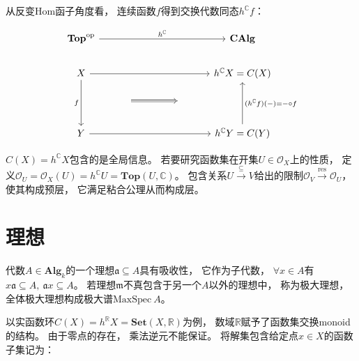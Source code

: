 \documentclass[10pt, openany]{book}
\begin{document}
从反变Hom函子角度看，
连续函数$f$得到交换代数同态$h^\mathbb C f$：

$$
\begin{tikzcd}
\textbf{Top}^\text{op} \arrow[rrrr, "h^\mathbb C"] &                           &  &    & \textbf{CAlg}                                                      \\
X \arrow[dd, "f"'] \arrow[rrrr]                    &                           &  &    & h^\mathbb C X = C(X)                                               \\
                                                   & {} \arrow[rr, Rightarrow] &  & {} &                                                                    \\
Y \arrow[rrrr]                                     &                           &  &    & h^\mathbb C Y = C(Y) \arrow[uu, "(h^\mathbb C f)(-) = - \circ f"']
\end{tikzcd}
$$

$C(X) = h^\mathbb C X$包含的是全局信息。
若要研究函数集在开集$U \in \mathcal O_X$上的性质，
定义$\mathcal O_U = \mathcal O_X(U) = h^\mathbb C U = \textbf{Top}(U,\mathbb C)$。
包含关系$U \stackrel{\subseteq}{\longrightarrow} V$给出的限制$\mathcal O_V \stackrel{\text{res}}{\longrightarrow} \mathcal O_U$，
使其构成预层，
它满足粘合公理从而构成层。

\section{理想}

代数$A\in\textbf{Alg}_k$的一个理想$\mathfrak a \subseteq A$具有吸收性，
它作为子代数，
$\forall x \in A$有$x \mathfrak a \subseteq A,\ \mathfrak a x \subseteq A$。
若理想$\mathfrak m$不真包含于另一个$A$以外的理想中，
称为极大理想，
全体极大理想构成极大谱$\text{MaxSpec} \ A$。

以实函数环$C(X) = h^\mathbb R X = \textbf{Set}(X,\mathbb R)$为例，
数域$\mathbb R$赋予了函数集交换monoid的结构。
由于零点的存在，
乘法逆元不能保证。
将解集包含给定点$x\in X$的函数子集记为：
\end{document}
